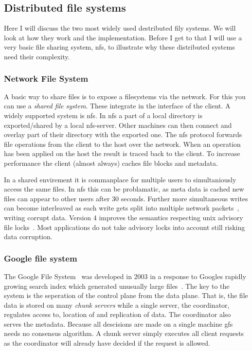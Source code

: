 \subsection{Distributed file systems}
Here I will discuss the two most widely used destributed fily systems. We will look at how they work and the implementation. Before I get to that I will use a very basic file sharing system, \ac{nfs}, to illustrate why these distributed systems need their complexity.

\subsubsection*{Network File System}
A basic way to share files is to expose a filesystems via the network. For this you can use a \textit{shared file system}. These integrate in the interface of the client. A widely supported system is \acf{nfs}. In \ac{nfs} a part of a local directory is exported/shared by a local \ac{nfs}-server. Other machines can then connect and overlay part of their directory with the exported one. The \ac{nfs} protocol forwards file operations from the client to the host over the network. When an operation has been applied on the host the result is traced back to the client. To increase performance the client (almost always) caches file blocks and metadata. 

In a shared envirement it is commanplace for multiple users to simultaniously access the same files. In \ac{nfs} this can be problamatic, as meta data is cached new files can appear to other users after 30 seconds. Further more simultaneous writes can become interleaved as each write gets split into multiple network packets~\cite[p. 527]{os}, writing corrupt data. Version 4 improves the semantics respecting unix advisory file locks~\cite{rfc3530}. Most applications do not take advisory locks into account still risking data corruption. 

\subsubsection*{Google file system}
The Google File System~\cite{GFS} was developed in 2003 in a response to Googles rapidly growing search index which generated unusually large files~\cite{GFS_interview}. The key to the system is the seperation of the control plane from the data plane. That is, the file data is stored on many \textit{chunk servers} while a single server, the coordinator, regulates access to, location of and replication of data. The coordinator also serves the metadata. Because all descisions are made on a single machine \ac{gfs} needs no consensus algorithm. A chunk server simply executes all client requests as the coordinator will already have decided if the request is allowed. 

